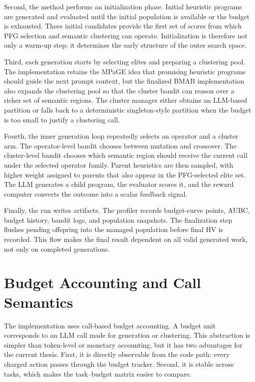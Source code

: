 Second, the method performs an initialization phase. Initial heuristic programs are generated and evaluated until the initial population is available or the budget is exhausted. These initial candidates provide the first set of scores from which PFG selection and semantic clustering can operate. Initialization is therefore not only a warm-up step; it determines the early structure of the outer search space.

Third, each generation starts by selecting elites and preparing a clustering pool. The implementation retains the MPaGE idea that promising heuristic programs should guide the next prompt context, but the finalized BMAB implementation also expands the clustering pool so that the cluster bandit can reason over a richer set of semantic regions. The cluster manager either obtains an LLM-based partition or falls back to a deterministic singleton-style partition when the budget is too small to justify a clustering call.

Fourth, the inner generation loop repeatedly selects an operator and a cluster arm. The operator-level bandit chooses between mutation and crossover. The cluster-level bandit chooses which semantic region should receive the current call under the selected operator family. Parent heuristics are then sampled, with higher weight assigned to parents that also appear in the PFG-selected elite set. The LLM generates a child program, the evaluator scores it, and the reward computer converts the outcome into a scalar feedback signal.

Finally, the run writes artifacts. The profiler records budget-curve points, AUBC, budget history, bandit logs, and population snapshots. The finalization step flushes pending offspring into the managed population before final HV is recorded. This flow makes the final result dependent on all valid generated work, not only on completed generations.

\section{Budget Accounting and Call Semantics}

The implementation uses call-based budget accounting. A budget unit corresponds to an LLM call made for generation or clustering. This abstraction is simpler than token-level or monetary accounting, but it has two advantages for the current thesis. First, it is directly observable from the code path: every charged action passes through the budget tracker. Second, it is stable across tasks, which makes the task--budget matrix easier to compare.

